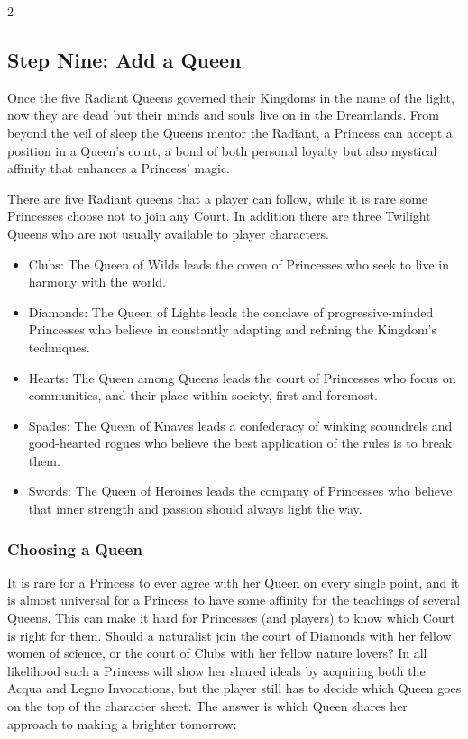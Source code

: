 \begin{multicols}{2}
\subsection*{Step Nine: Add a Queen}

Once the five Radiant Queens governed their Kingdoms in the name of the light, now they are dead but their minds and souls live on in the Dreamlands. From beyond the veil of sleep the Queens mentor the Radiant, a Princess can accept a position in a Queen's court, a bond of both personal loyalty but also mystical affinity that enhances a Princess' magic. 

There are five Radiant queens that a player can follow, while it is rare some Princesses choose not to join any Court. In addition there are three Twilight Queens who are not usually available to player characters. 

\begin{itemize}
\item Clubs: The Queen of Wilds leads the coven of Princesses who seek to live in harmony with the world.
\item Diamonds: The Queen of Lights leads the conclave of progressive-minded Princesses who believe in constantly adapting and refining the Kingdom's techniques.
\item Hearts: The Queen among Queens leads the court of Princesses who focus on communities, and their place within society, first and foremost.
\item Spades: The Queen of Knaves leads a confederacy of winking scoundrels and good-hearted rogues who believe the best application of the rules is to break them.
\item Swords: The Queen of Heroines leads the company of Princesses who believe that inner strength and passion should always light the way. 
\end{itemize}

\bigsidebarstart
 
\subsubsection*{Choosing a Queen}
It is rare for a Princess to ever agree with her Queen on every single point, and it is almost universal for a Princess to have some affinity for the teachings of several Queens. This can make it hard for Princesses (and players) to know which Court is right for them. Should a naturalist join the court of Diamonds with her fellow women of science, or the court of Clubs with her fellow nature lovers? In all likelihood such a Princess will show her shared ideals by acquiring both the Acqua and Legno Invocations, but the player still has to decide which Queen goes on the top of the character sheet. The answer is which Queen shares her approach to making a brighter tomorrow:


\end{multicols}

